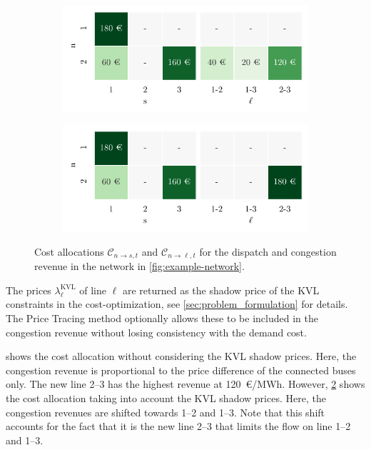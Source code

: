 \documentclass[11pt,twocolumn]{article}
\newcommand{\cost}{\mathcal{C}}
\newcommand{\allocategeneratorcost}[1][n \rightarrow s]{\cost_{#1, t}}
\newcommand{\allocatelinecost}[1][n \rightarrow \ell]{\cost_{#1, t}}
\begin{document}
\begin{figure}[h!]
    \begin{subfigure}[c]{\linewidth}
        \includegraphics[width=\linewidth]{example-with-cycles/payoff}
        \label{fig:example-network-payoff}
    \end{subfigure}
    \begin{subfigure}[c]{\linewidth}
        \includegraphics[width=\linewidth]{example-with-cycles/payoff-kvl}
        \label{fig:example-network-payoff-kvl}
    \end{subfigure}
    \caption{Cost allocations $\allocategeneratorcost$ and $\allocatelinecost$ for the dispatch and congestion revenue in the network in \cref{fig:example-network}.}
    \label{fig:example-network-payoff-all}
\end{figure}

The prices $\lambda_\ell^\text{KVL}$ of line $\ell$ are returned as the shadow price of the \ac{KVL} constraints in the cost-optimization, see \cref{sec:problem_formulation} for details. The Price Tracing method optionally allows these to be included in the congestion revenue without losing consistency with the demand cost. 



 shows the cost allocation without considering the \ac{KVL} shadow prices. Here, the congestion revenue is proportional to the price difference of the connected buses only. The new line 2--3 has the highest revenue at 120~\euro/MWh. However, \cref{fig:example-network-payoff-kvl} shows the cost allocation taking into account the \ac{KVL} shadow prices. Here, the congestion revenues are shifted towards 1--2 and 1--3. Note that this shift accounts for the fact that it is the new line 2--3 that limits the flow on line 1--2 and 1--3.    
\end{document}
